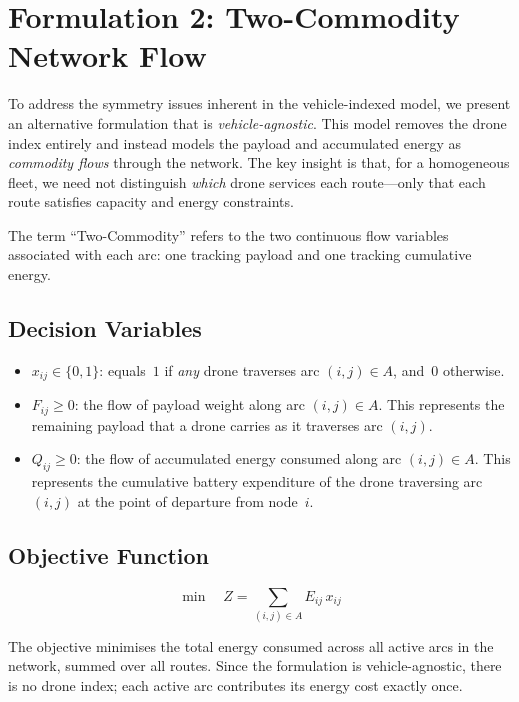 \documentclass[11pt,a4paper]{article}
\begin{document}
\section{Formulation 2: Two-Commodity Network Flow}

To address the symmetry issues inherent in the vehicle-indexed model, we present an alternative formulation that is \emph{vehicle-agnostic}. This model removes the drone index entirely and instead models the payload and accumulated energy as \emph{commodity flows} through the network. The key insight is that, for a homogeneous fleet, we need not distinguish \emph{which} drone services each route---only that each route satisfies capacity and energy constraints.

The term ``Two-Commodity'' refers to the two continuous flow variables associated with each arc: one tracking payload and one tracking cumulative energy.

\subsection{Decision Variables}
\begin{itemize}
  \item $x_{ij} \in \{0, 1\}$: equals~$1$ if \emph{any} drone traverses arc $(i,j) \in A$, and~$0$ otherwise.
  \item $F_{ij} \ge 0$: the flow of payload weight along arc $(i,j) \in A$. This represents the remaining payload that a drone carries as it traverses arc $(i,j)$.
  \item $Q_{ij} \ge 0$: the flow of accumulated energy consumed along arc $(i,j) \in A$. This represents the cumulative battery expenditure of the drone traversing arc $(i,j)$ at the point of departure from node~$i$.
\end{itemize}

\subsection{Objective Function}
\begin{equation}
  \min \quad Z = \sum_{(i,j) \in A} E_{ij} \, x_{ij}
  \label{eq:f2_obj}
\end{equation}

The objective minimises the total energy consumed across all active arcs in the network, summed over all routes. Since the formulation is vehicle-agnostic, there is no drone index; each active arc contributes its energy cost exactly once.
\end{document}
